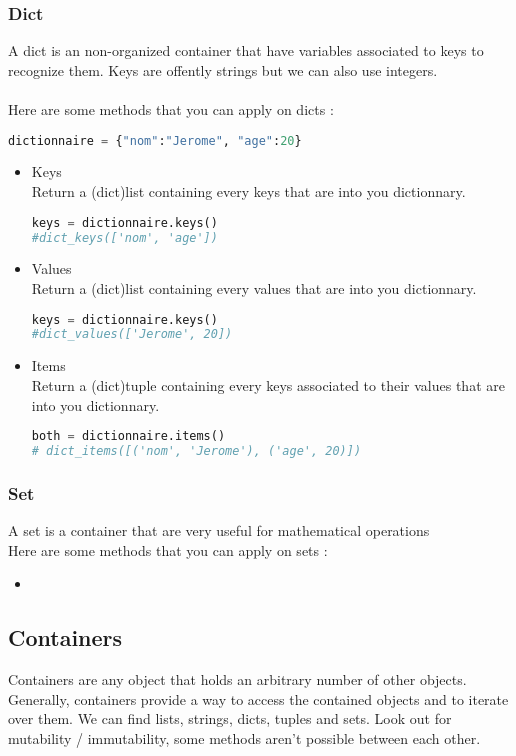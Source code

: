 \documentclass[a4paper, 12pt]{article}
\begin{document}
\subsubsection{Dict}
A dict is an non-organized container that have variables associated to keys to recognize them. Keys are offently strings but we can also use integers.\\ \\
Here are some methods that you can apply on dicts : 
\begin{lstlisting}[language=Python]
dictionnaire = {"nom":"Jerome", "age":20}
\end{lstlisting}

\begin{itemize}
\item Keys \\
Return a (dict)list containing every keys that are into you dictionnary.
\begin{lstlisting}[language=Python]
keys = dictionnaire.keys()
#dict_keys(['nom', 'age'])
\end{lstlisting}

\item Values \\
Return a (dict)list containing every values that are into you dictionnary.
\begin{lstlisting}[language=Python]
keys = dictionnaire.keys()
#dict_values(['Jerome', 20])
\end{lstlisting}

\item Items \\
Return a (dict)tuple containing every keys associated to their values that are into you dictionnary.
\begin{lstlisting}[language=Python]
both = dictionnaire.items()
# dict_items([('nom', 'Jerome'), ('age', 20)])
\end{lstlisting}
\end{itemize}

\subsubsection{Set}
A set is a container that are very useful for mathematical operations\\
Here are some methods that you can apply on sets : 
\begin{itemize}
\item
\end{itemize}

\subsection{Containers}
Containers are any object that holds an arbitrary number of other objects. Generally, containers provide a way to access the contained objects and to iterate over them. We can find lists, strings, dicts, tuples and sets. Look out for mutability / immutability, some methods aren't possible between each other. \\
\end{document}
